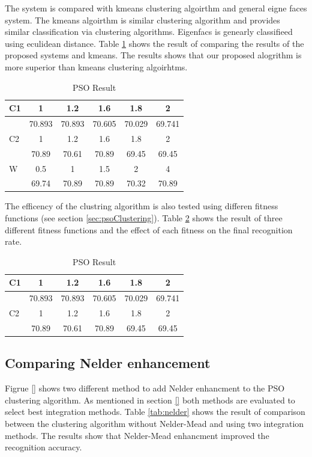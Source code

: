\documentclass[a4paper,twoside]{article}
\begin{document}
The system is compared with kmeans clustering algoirthm and general eigne faces system. The kmeans algoirthm is similar clustering algorithm and provides similar classification via clustering algorithms. Eigenfacs is genearly classifieed using eculidean distance. Table \ref{tab:system} shows the result of comparing the results of the proposed systems and kmeans. The results shows that our proposed alogrithm is more superior than kmeans clustering algoirhtms. 


\begin{table}
	\centering
		\caption{PSO Result }
	\label{tab:system}
		\begin{tabular}{|l|c|c|c|c|c|}
		 \hline
C1 &	1	&1.2&	1.6&	1.8 &	2	\\ \hline
	&70.893	&70.893	&70.605	&70.029	&69.741 \\  \hline
C2	&	1	&1.2&	1.6&	1.8 &	2	\\ \hline
	&70.89	&70.61	&70.89	&69.45	&69.45 \\ \hline
W	&0.5&	1	&1.5	&2&	4	\\ \hline
	&69.74	&70.89&	70.89	&70.32&	70.89	\\ \hline
\end{tabular}
\end{table}


The efficency of the clustring algorithm is also  tested using differen fitness functions (see section \ref{sec:psoClustering}). Table \ref{tab:fitness}  shows the result of three different fitness functions and the effect of each fitness on the final recognition rate. 


\begin{table}
	\centering
		\caption{PSO Result }
	\label{tab:fitness}
		\begin{tabular}{|l|c|c|c|c|c|}
		 \hline
C1 &	1	&1.2&	1.6&	1.8 &	2	\\ \hline
	&70.893	&70.893	&70.605	&70.029	&69.741 \\  \hline
C2	&	1	&1.2&	1.6&	1.8 &	2	\\ \hline
	&70.89	&70.61	&70.89	&69.45	&69.45 \\ \hline

\end{tabular}
\end{table}

\subsection{ Comparing Nelder enhancement}
\label{sec:comparingSystems}
Figrue \ref{} shows two different method to add Nelder enhancment to the PSO clustering algorithm. As mentioned in section \ref{} both methods are evaluated to select best integration methods.  Table \ref{tab:nelder} shows the result of comparison between the clustering algorithm without Nelder-Mead and using two integration methods. The results show that Nelder-Mead enhancment improved the recognition accuracy. %
\end{document}
